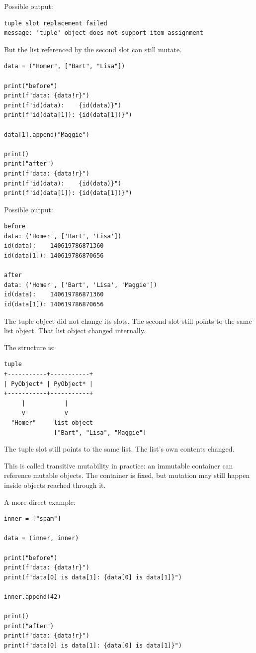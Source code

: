 Possible output:

\begin{verbatim}
tuple slot replacement failed
message: 'tuple' object does not support item assignment
\end{verbatim}

But the list referenced by the second slot can still mutate.

\begin{verbatim}
data = ("Homer", ["Bart", "Lisa"])

print("before")
print(f"data: {data!r}")
print(f"id(data):    {id(data)}")
print(f"id(data[1]): {id(data[1])}")

data[1].append("Maggie")

print()
print("after")
print(f"data: {data!r}")
print(f"id(data):    {id(data)}")
print(f"id(data[1]): {id(data[1])}")
\end{verbatim}

Possible output:

\begin{verbatim}
before
data: ('Homer', ['Bart', 'Lisa'])
id(data):    140619786871360
id(data[1]): 140619786870656

after
data: ('Homer', ['Bart', 'Lisa', 'Maggie'])
id(data):    140619786871360
id(data[1]): 140619786870656
\end{verbatim}

The tuple object did not change its slots. The second slot still points to the same list object. That list object changed internally.

The structure is:

\begin{verbatim}
tuple
+-----------+-----------+
| PyObject* | PyObject* |
+-----------+-----------+
     |           |
     v           v
  "Homer"     list object
              ["Bart", "Lisa", "Maggie"]
\end{verbatim}

The tuple slot still points to the same list. The list's own contents changed.

This is called transitive mutability in practice: an immutable container can reference mutable objects. The container is fixed, but mutation may still happen inside objects reached through it.

A more direct example:

\begin{verbatim}
inner = ["spam"]

data = (inner, inner)

print("before")
print(f"data: {data!r}")
print(f"data[0] is data[1]: {data[0] is data[1]}")

inner.append(42)

print()
print("after")
print(f"data: {data!r}")
print(f"data[0] is data[1]: {data[0] is data[1]}")
\end{verbatim}

